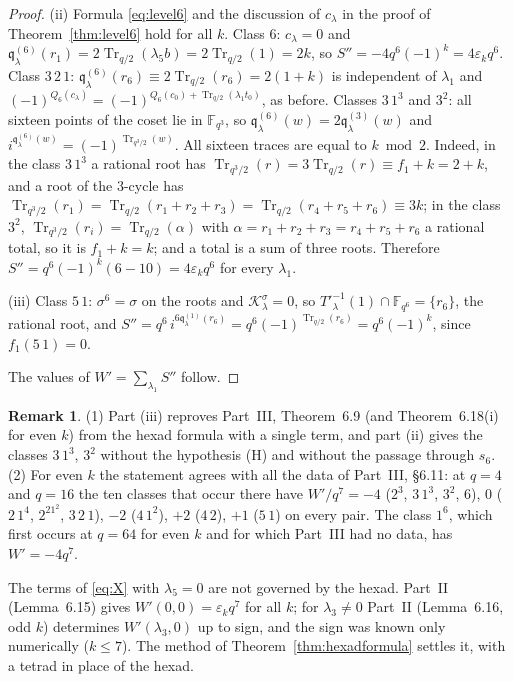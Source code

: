 \documentclass[12pt,a4paper]{amsart}
\theoremstyle{definition}
\newtheorem{remark}[theorem]{Remark}
\newcommand{\F}{\mathbb{F}}
\newcommand{\Tr}{\operatorname{Tr}}
\newcommand{\eps}{\varepsilon}
\newcommand{\Kk}{\mathcal{K}}
\newcommand{\qq}{\mathfrak{q}}
\newcommand{\Spp}{S''}
\begin{document}
\begin{proof}
(ii) Formula \eqref{eq:level6} and the discussion of $c_\lambda$ in the proof of Theorem~\ref{thm:level6} hold for all $k$. Class $6$: $c_\lambda=0$ and $\qq^{(6)}_\lambda(r_1)=2\Tr_{q/2}(\lambda_5b)=2\Tr_{q/2}(1)=2k$, so $\Spp=-4q^6(-1)^k=4\eps_kq^6$. Class $3\,2\,1$: $\qq^{(6)}_\lambda(r_6)\equiv2\Tr_{q/2}(r_6)=2(1+k)$ is independent of $\lambda_1$ and $(-1)^{Q_6(c_\lambda)}=(-1)^{Q_6(c_0)+\Tr_{q/2}(\lambda_1t_0)}$, as before. Classes $3\,1^3$ and $3^2$: all sixteen points of the coset lie in $\F_{q^3}$, so $\qq^{(6)}_\lambda(w)=2\qq^{(3)}_\lambda(w)$ and $i^{\qq^{(6)}_\lambda(w)}=(-1)^{\Tr_{q^3/2}(w)}$. All sixteen traces are equal to $k\bmod2$. Indeed, in the class $3\,1^3$ a rational root has $\Tr_{q^3/2}(r)=3\Tr_{q/2}(r)\equiv f_1+k=2+k$, and a root of the $3$-cycle has $\Tr_{q^3/2}(r_1)=\Tr_{q/2}(r_1+r_2+r_3)=\Tr_{q/2}(r_4+r_5+r_6)\equiv3k$; in the class $3^2$, $\Tr_{q^3/2}(r_i)=\Tr_{q/2}(\alpha)$ with $\alpha=r_1+r_2+r_3=r_4+r_5+r_6$ a rational total, so it is $f_1+k=k$; and a total is a sum of three roots. Therefore $\Spp=q^6(-1)^k(6-10)=4\eps_kq^6$ for every $\lambda_1$.

(iii) Class $5\,1$: $\sigma^6=\sigma$ on the roots and $\Kk_\lambda^\sigma=0$, so $T'^{-1}_\lambda(1)\cap\F_{q^6}=\{r_6\}$, the rational root, and $\Spp=q^6\,i^{6\qq^{(1)}_\lambda(r_6)}=q^6(-1)^{\Tr_{q/2}(r_6)}=q^6(-1)^{k}$, since $f_1(5\,1)=0$.

The values of $W'=\sum_{\lambda_1}\Spp$ follow.
\end{proof}

\begin{remark}
(1) Part (iii) reproves Part~III, Theorem~6.9 (and Theorem~6.18(i) for even $k$) from the hexad formula with a single term, and part (ii) gives the classes $3\,1^3$, $3^2$ without the hypothesis (H) and without the passage through $s_6$. (2) For even $k$ the statement agrees with all the data of Part~III, \S6.11: at $q=4$ and $q=16$ the ten classes that occur there have $W'/q^7=-4$ ($2^3$, $3\,1^3$, $3^2$, $6$), $0$ ($2\,1^4$, $2^21^2$, $3\,2\,1$), $-2$ ($4\,1^2$), $+2$ ($4\,2$), $+1$ ($5\,1$) on every pair. The class $1^6$, which first occurs at $q=64$ for even $k$ and for which Part~III had no data, has $W'=-4q^7$.
\end{remark}

The terms of \eqref{eq:X} with $\lambda_5=0$ are not governed by the hexad. Part~II (Lemma~6.15) gives $W'(0,0)=\eps_kq^7$ for all $k$; for $\lambda_3\ne0$ Part~II (Lemma~6.16, odd $k$) determines $W'(\lambda_3,0)$ up to sign, and the sign was known only numerically ($k\le7$). The method of Theorem~\ref{thm:hexadformula} settles it, with a tetrad in place of the hexad.
\end{document}
